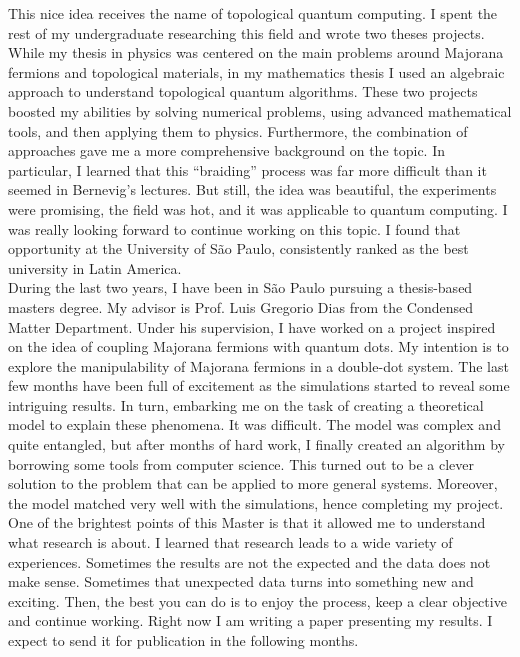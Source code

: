 \documentclass[11pt,a4paper,sans]{moderncv}        %
\begin{document}
This nice idea receives the name of topological quantum computing. I spent the rest of my undergraduate researching this field and wrote two theses projects. While my thesis in physics was centered on the main problems around Majorana fermions and topological materials, in my mathematics thesis I used an algebraic approach to understand topological quantum algorithms. These two projects boosted my abilities by solving numerical problems, using advanced mathematical tools, and then applying them to physics. Furthermore, the combination of approaches gave me a more comprehensive background on the topic. In particular, I learned that this “braiding” process was far more difficult than it seemed in Bernevig's lectures. But still, the idea was beautiful, the experiments were promising, the field was hot, and it was applicable to quantum computing. I was really looking forward to continue working on this topic. I found that opportunity at the University of São Paulo, consistently ranked as the best university in Latin America. \\

During the last two years, I have been in São Paulo pursuing a thesis-based masters degree.  My advisor is Prof. Luis Gregorio Dias from the Condensed Matter Department. Under his supervision, I have worked on a project inspired on the idea of coupling Majorana fermions with quantum dots. My intention is to explore the manipulability of Majorana fermions in a double-dot system. The last few months have been full of excitement as the simulations started to reveal some intriguing results. In turn, embarking me on the task of creating a theoretical model to explain these phenomena. It was difficult. The model was complex and quite entangled, but after months of hard work, I finally created an algorithm by borrowing some tools from computer science. This turned out to be a clever solution to the problem that can be applied to more general systems. Moreover, the model matched very well with the simulations, hence completing my project. One of the brightest points of this Master is that it allowed me to understand what research is about. I learned that research leads to a wide variety of experiences. Sometimes the results are not the expected and the data does not make sense. Sometimes that unexpected data turns into something new and exciting. Then, the best you can do is to enjoy the process,  keep a clear objective and continue working. Right now I am writing a paper presenting my results. I expect to send it for publication in the following months. \\
\end{document}
